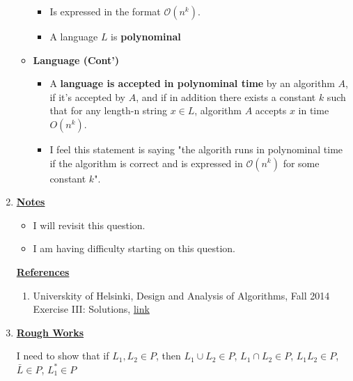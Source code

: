 \documentclass[12pt]{article}
\begin{document}
\begin{enumerate}[1.]
\begin{itemize}
        \begin{itemize}
            \item Is expressed in the format $\mathcal{O}(n^k)$.
            \item A language $L$ is \textbf{polynominal}
        \end{itemize}

        \item \textbf{Language (Cont')}

        \begin{itemize}
            \item A \textbf{language is accepted in polynominal time} by an algorithm $A$,
            if it's accepted by $A$, and if in addition there exists a constant $k$ such that
            for any length-n string $x \in L$, algorithm $A$ accepts $x$ in time $O(n^k)$.
            \item I feel this statement is saying "the algorith runs in polynominal time if the algorithm is correct and is expressed in $\mathcal{O}(n^k)$ for some constant $k$".
        \end{itemize}
    \end{itemize}

    \item

    \bigskip

    \underline{\textbf{Notes}}

    \begin{itemize}
        \item I will revisit this question.
        \item I am having difficulty starting on this question.
    \end{itemize}

    \underline{\textbf{References}}

    \begin{enumerate}[1)]
        \item Universkity of Helsinki, Design and Analysis of Algorithms, Fall 2014 Exercise III: Solutions, \href{https://www.cs.helsinki.fi/webfm_send/1461}{link}
    \end{enumerate}

    \item

    \underline{\textbf{Rough Works}}

    \bigskip

    I need to show that if $L_1,L_2 \in P$, then $L_1 \cup L_2 \in P$, $L_1 \cap L_2 \in P$,
    $L_1L_2 \in P$, $\bar{L} \in P$, $L_1^* \in P$


\end{enumerate}
\end{document}
